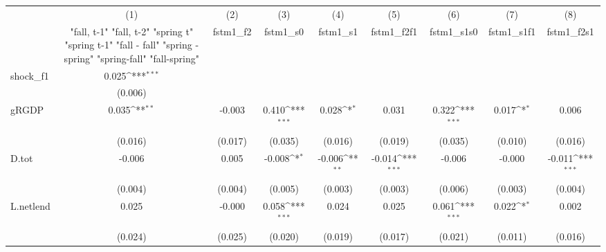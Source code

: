 {
\def\sym#1{\ifmmode^{#1}\else\(^{#1}\)\fi}
\begin{tabular}{l*{8}{c}}
\toprule
            &\multicolumn{1}{c}{(1)}&\multicolumn{1}{c}{(2)}&\multicolumn{1}{c}{(3)}&\multicolumn{1}{c}{(4)}&\multicolumn{1}{c}{(5)}&\multicolumn{1}{c}{(6)}&\multicolumn{1}{c}{(7)}&\multicolumn{1}{c}{(8)}\\
            &\multicolumn{1}{c}{  "fall, t-1" "fall, t-2" "spring t" "spring t-1"  "fall - fall" "spring - spring" "spring-fall" "fall-spring" }&\multicolumn{1}{c}{fstm1\_f2}&\multicolumn{1}{c}{fstm1\_s0}&\multicolumn{1}{c}{fstm1\_s1}&\multicolumn{1}{c}{fstm1\_f2f1}&\multicolumn{1}{c}{fstm1\_s1s0}&\multicolumn{1}{c}{fstm1\_s1f1}&\multicolumn{1}{c}{fstm1\_f2s1}\\
\midrule
shock\_f1    &       0.025\sym{***}&                     &                     &                     &                     &                     &                     &                     \\
            &     (0.006)         &                     &                     &                     &                     &                     &                     &                     \\
\addlinespace
gRGDP       &       0.035\sym{**} &      -0.003         &       0.410\sym{***}&       0.028\sym{*}  &       0.031         &       0.322\sym{***}&       0.017\sym{*}  &       0.006         \\
            &     (0.016)         &     (0.017)         &     (0.035)         &     (0.016)         &     (0.019)         &     (0.035)         &     (0.010)         &     (0.016)         \\
\addlinespace
D.tot       &      -0.006         &       0.005         &      -0.008\sym{*}  &      -0.006\sym{**} &      -0.014\sym{***}&      -0.006         &      -0.000         &      -0.011\sym{***}\\
            &     (0.004)         &     (0.004)         &     (0.005)         &     (0.003)         &     (0.003)         &     (0.006)         &     (0.003)         &     (0.004)         \\
\addlinespace
L.netlend   &       0.025         &      -0.000         &       0.058\sym{***}&       0.024         &       0.025         &       0.061\sym{***}&       0.022\sym{*}  &       0.002         \\
            &     (0.024)         &     (0.025)         &     (0.020)         &     (0.019)         &     (0.017)         &     (0.021)         &     (0.011)         &     (0.016)         \\

\end{tabular}}
